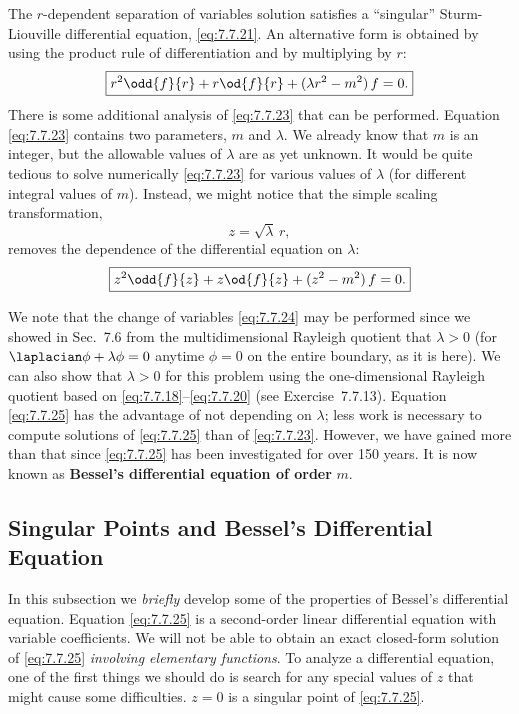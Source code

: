 The $r$-dependent separation of variables solution satisfies a ``singular'' Sturm-Liouville differential equation, \eqref{eq:7.7.21}.  An alternative form is obtained by using the product rule of differentiation and by multiplying by $r$:
\begin{equation}
\boxed{r^2\odd{f}{r} + r\od{f}{r} + (\lambda r^2 - m^2)\,f = 0.}
\label{eq:7.7.23}
\end{equation}
There is some additional analysis of \eqref{eq:7.7.23} that can be performed.  Equation \eqref{eq:7.7.23} contains two parameters, $m$ and $\lambda$.  We already know that $m$ is an integer, but the allowable values of $\lambda$ are as yet unknown.  It would be quite tedious to solve numerically \eqref{eq:7.7.23} for various values of $\lambda$ (for different integral values of $m$).  Instead, we might notice that the simple scaling transformation,
\begin{equation}
\boxed{z = \sqrt{\lambda}\,r,}
\label{eq:7.7.24}
\end{equation}
removes the dependence of the differential equation on $\lambda$:
\begin{equation}
\boxed{z^2\odd{f}{z} + z\od{f}{z} + (z^2 - m^2)\,f = 0.}
\label{eq:7.7.25}
\end{equation}

We note that the change of variables \eqref{eq:7.7.24} may be performed since we showed in Sec.~7.6 from the multidimensional Rayleigh quotient that $\lambda > 0$ (for $\laplacian\phi + \lambda\phi = 0$ anytime $\phi = 0$ on the entire boundary, as it is here).  We can also show that $\lambda > 0$ for this problem using the one-dimensional Rayleigh quotient based on \eqref{eq:7.7.18}--\eqref{eq:7.7.20} (see Exercise~7.7.13).  Equation \eqref{eq:7.7.25} has the advantage of not depending on $\lambda$; less work is necessary to compute solutions of \eqref{eq:7.7.25} than of \eqref{eq:7.7.23}.  However, we have gained more than that since \eqref{eq:7.7.25} has been investigated for over 150 years.  It is now known as \textbf{Bessel's differential equation of order} $m$.

\subsection{Singular Points and Bessel's Differential Equation}
\label{sec:7.7.5}

In this subsection we \emph{briefly} develop some of the properties of Bessel's differential equation.  Equation \eqref{eq:7.7.25} is a second-order linear differential equation with variable coefficients.  We will not be able to obtain an exact closed-form solution of \eqref{eq:7.7.25} \emph{involving elementary functions}.  To analyze a differential equation, one of the first things we should do is search for any special values of $z$ that might cause some difficulties.  $z = 0$ is a singular point of \eqref{eq:7.7.25}.

